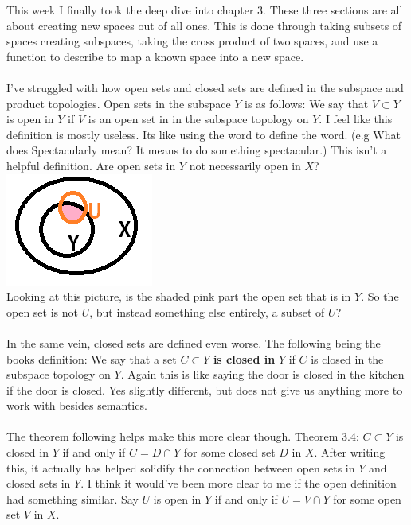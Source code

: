 \documentclass[10pt]{article}
\begin{document}
This week I finally took the deep dive into chapter 3. These three sections are all about creating new spaces out of all ones. This is done through taking subsets of spaces creating subspaces, taking the cross product of two spaces, and use a function to describe to map a known space into a new space. \\
\\
I've struggled with how open sets and closed sets are defined in the subspace and product topologies. Open sets in the subspace $ Y $ is as follows: We say that $ V\subset Y $ is open in $ Y $ if $ V $ is an open set in in the subspace topology on $ Y $. I feel like this definition is mostly useless. Its like using the word to define the word. (e.g What does Spectacularly mean? It means to do something spectacular.) This isn't a helpful definition. Are open sets in $ Y $ not necessarily open in $ X $?\\
\includegraphics*[scale=.4]{Open-Sets-in-Y.png}
 \\
 Looking at this picture, is the shaded pink part the open set that is in $ Y $. So the open set is not $ U$, but instead something else entirely, a subset of $ U $?\\
\\
In the same vein, closed sets are defined even worse. The following being the books definition: We say that a set $ C\subset Y $ \textbf{is closed in} $ Y $ if $ C $ is closed in the subspace topology on $ Y $. Again this is like saying the door is closed in the kitchen if the door is closed. Yes slightly different, but does not give us anything more to work with besides semantics.\\
\\
The theorem following helps make this more clear though. Theorem 3.4: $ C\subset Y $ is closed in $ Y $ if and only if $ C=D\cap Y $ for some closed set $ D $ in $ X $. After writing this, it actually has helped solidify the connection between open sets in $ Y $ and closed sets in $ Y $. I think it would've been more clear to me if the open definition had something similar. Say $ U $ is open in $ Y $ if and only if $ U=V\cap Y $ for some open set $ V $ in $ X $.\\
\end{document}
